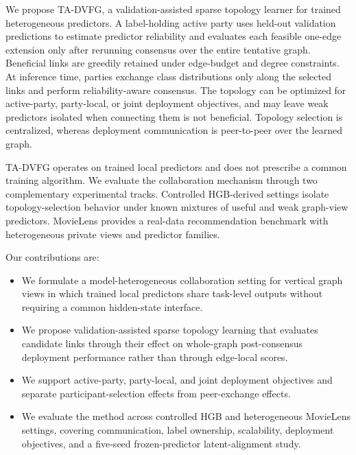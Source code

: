 \documentclass[letterpaper]{article} %
\newcommand{\method}{\textsc{TA-DVFG}}
\begin{document}
We propose \method{}, a validation-assisted sparse topology learner for trained
heterogeneous predictors. A label-holding active party uses held-out validation
predictions to estimate predictor reliability and evaluates each feasible
one-edge extension only after rerunning consensus over the entire tentative
graph. Beneficial links are greedily retained under edge-budget and degree
constraints. At inference time, parties exchange class distributions only
along the selected links and perform reliability-aware consensus. The topology
can be optimized for active-party, party-local, or joint deployment objectives,
and may leave weak predictors isolated when connecting them is not beneficial.
Topology selection is centralized, whereas deployment communication is
peer-to-peer over the learned graph.

\method{} operates on trained local predictors and does not prescribe a common
training algorithm. We evaluate the collaboration mechanism through two
complementary experimental tracks. Controlled HGB-derived settings isolate
topology-selection behavior under known mixtures of useful and weak graph-view
predictors. MovieLens provides a real-data recommendation benchmark with
heterogeneous private views and predictor families.

Our contributions are:
\begin{itemize}

\item We formulate a model-heterogeneous collaboration setting for vertical
graph views in which trained local predictors share task-level outputs without
requiring a common hidden-state interface.

\item We propose validation-assisted sparse topology learning that evaluates
candidate links through their effect on whole-graph post-consensus deployment
performance rather than through edge-local scores.

\item We support active-party, party-local, and joint deployment objectives
and separate participant-selection effects from peer-exchange effects.

\item We evaluate the method across controlled HGB and heterogeneous
MovieLens settings, covering communication, label ownership, scalability,
deployment objectives, and a five-seed frozen-predictor latent-alignment study.

\end{itemize}
\end{document}
